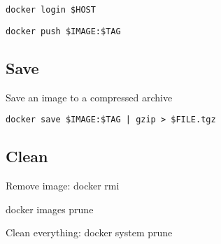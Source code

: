 \texttt{docker login \$HOST}

\texttt{docker push \$IMAGE:\$TAG}



\subsection*{Save}


Save an image to a compressed archive

\texttt{docker save \$IMAGE:\$TAG | gzip > \$FILE.tgz }

\subsection*{Clean}

Remove image: docker rmi

docker images prune

Clean everything: docker system prune




%
%



